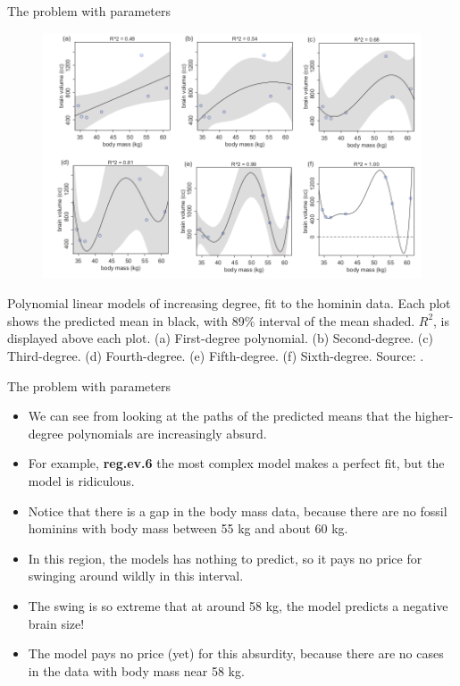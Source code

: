 \documentclass[handout]{beamer}
\begin{document}
\begin{frame}[fragile]{The problem with parameters}
\scriptsize{

\begin{figure}[h!]
	\centering
	\includegraphics[scale=0.41]{pics/polyover.png}
\end{figure}

Polynomial linear models of increasing degree, fit to the hominin data. Each plot shows the predicted mean in black, with 89\% interval of the mean shaded. $R^2$, is displayed above each plot. (a) First-degree polynomial. (b) Second-degree. (c) Third-degree. (d) Fourth-degree. (e) Fifth-degree. (f) Sixth-degree. Source: \cite{mcelreath2020statistical}. 

} 
\end{frame}




\begin{frame}{The problem with parameters}
\scriptsize{

\begin{itemize}

\item We can see from looking at the paths of the predicted means that the higher-degree polynomials are increasingly absurd. 

\item For example, \textbf{reg.ev.6} the most complex model makes a perfect fit, but the model is ridiculous. 

\item Notice that there is a gap in the body mass data, because there are no fossil
hominins with body mass between 55 kg and about 60 kg. 
\item In this region, the models has nothing to predict, so it pays no price for swinging around wildly in this interval.
\item The swing is so extreme that at around 58 kg, the model predicts a negative brain size!

\item The model pays no price (yet) for this absurdity, because there are no cases in the data with body mass near 58 kg.

\end{itemize}


} 
\end{frame}
\end{document}
